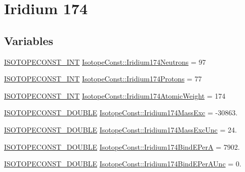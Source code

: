\hypertarget{group___isotope_const-_iridium-_ir174}{}\section{Iridium 174}
\label{group___isotope_const-_iridium-_ir174}
\subsection*{Variables}
\begin{DoxyCompactItemize}
\item 
\mbox{\hyperlink{group___isotope_const-_macros_ga5f18360b3e99483a35c32d789e62621c}{I\+S\+O\+T\+O\+P\+E\+C\+O\+N\+S\+T\+\_\+\+I\+NT}} \mbox{\hyperlink{group___isotope_const-_iridium-_ir174_ga0d5c407ce6b653e13892695cdfceb0a4}{Isotope\+Const\+::\+Iridium174\+Neutrons}} = 97
\item 
\mbox{\hyperlink{group___isotope_const-_macros_ga5f18360b3e99483a35c32d789e62621c}{I\+S\+O\+T\+O\+P\+E\+C\+O\+N\+S\+T\+\_\+\+I\+NT}} \mbox{\hyperlink{group___isotope_const-_iridium-_ir174_ga644291d6896616ebb1c022f2d0fcc0dd}{Isotope\+Const\+::\+Iridium174\+Protons}} = 77
\item 
\mbox{\hyperlink{group___isotope_const-_macros_ga5f18360b3e99483a35c32d789e62621c}{I\+S\+O\+T\+O\+P\+E\+C\+O\+N\+S\+T\+\_\+\+I\+NT}} \mbox{\hyperlink{group___isotope_const-_iridium-_ir174_gaf006febf72c8dbadf67f1e8b754430d8}{Isotope\+Const\+::\+Iridium174\+Atomic\+Weight}} = 174
\item 
\mbox{\hyperlink{group___isotope_const-_macros_ga8f45a7272ce02c0b4c65c44636ed719a}{I\+S\+O\+T\+O\+P\+E\+C\+O\+N\+S\+T\+\_\+\+D\+O\+U\+B\+LE}} \mbox{\hyperlink{group___isotope_const-_iridium-_ir174_gacd511480c05979d19c3a677c4b8844dd}{Isotope\+Const\+::\+Iridium174\+Mass\+Exc}} = -\/30863.
\item 
\mbox{\hyperlink{group___isotope_const-_macros_ga8f45a7272ce02c0b4c65c44636ed719a}{I\+S\+O\+T\+O\+P\+E\+C\+O\+N\+S\+T\+\_\+\+D\+O\+U\+B\+LE}} \mbox{\hyperlink{group___isotope_const-_iridium-_ir174_ga2803642d3ce7a29bc990b9619003a6fb}{Isotope\+Const\+::\+Iridium174\+Mass\+Exc\+Unc}} = 24.
\item 
\mbox{\hyperlink{group___isotope_const-_macros_ga8f45a7272ce02c0b4c65c44636ed719a}{I\+S\+O\+T\+O\+P\+E\+C\+O\+N\+S\+T\+\_\+\+D\+O\+U\+B\+LE}} \mbox{\hyperlink{group___isotope_const-_iridium-_ir174_ga72ead0663a9437d121e58497b56040d4}{Isotope\+Const\+::\+Iridium174\+Bind\+E\+PerA}} = 7902.
\item 
\mbox{\hyperlink{group___isotope_const-_macros_ga8f45a7272ce02c0b4c65c44636ed719a}{I\+S\+O\+T\+O\+P\+E\+C\+O\+N\+S\+T\+\_\+\+D\+O\+U\+B\+LE}} \mbox{\hyperlink{group___isotope_const-_iridium-_ir174_gaf10a26ae87b15de7b18d97e387661a86}{Isotope\+Const\+::\+Iridium174\+Bind\+E\+Per\+A\+Unc}} = 0.

\end{DoxyCompactItemize}
